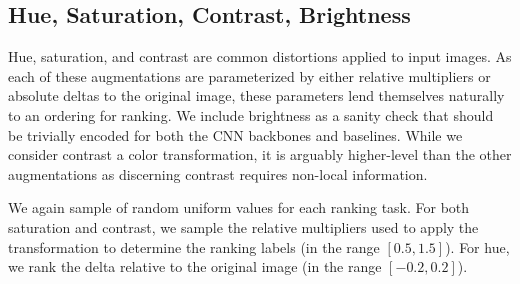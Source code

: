 \subsection{Hue, Saturation, Contrast, Brightness}
\label{sec:define_color}
Hue, saturation, and contrast are common distortions applied to input images.
As each of these augmentations are parameterized by either relative multipliers or absolute deltas to the original image, these parameters lend themselves naturally to an ordering for ranking.
We include brightness as a sanity check that should be trivially encoded for both the CNN backbones and baselines.
While we consider contrast a color transformation, it is arguably higher-level than the other augmentations as discerning contrast requires non-local information.

We again sample of random uniform values for each ranking task.
For both saturation and contrast, we sample the relative multipliers used to apply the transformation to determine the ranking labels (in the range $[0.5, 1.5]$).
For hue, we rank the delta relative to the original image (in the range $[-0.2, 0.2]$).



